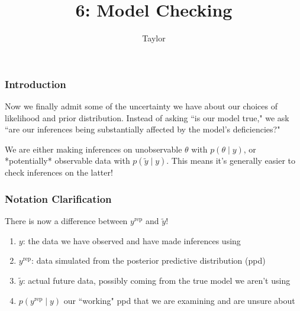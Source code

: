 \documentclass{beamer}
\title["6"]{6: Model Checking}
\author{Taylor}
\institute[UVA] 
{
University of Virginia \\
\medskip
\textit{} 
}
\date{}
\begin{document}

\begin{frame}
\titlepage 
\end{frame}

\begin{frame}
\frametitle{Introduction}

Now we finally admit some of the uncertainty we have about our choices of likelihood and prior distribution. Instead of asking ``is our  model true," we ask ``are our inferences being substantially affected by the model's deficiencies?"
\newline

We are either making inferences on unobservable $\theta$ with $p(\theta \mid y)$, or *potentially* observable data with $p(\tilde{y} \mid y)$. This means it's generally easier to check inferences on the latter!

\end{frame}

\begin{frame}
\frametitle{Notation Clarification}

There is now a difference between $y^{\text{rep}}$ and $\tilde{y}$!
\newline

\begin{enumerate}
\item $y$: the data we have observed and have made inferences using
\item $y^{\text{rep}}$: data simulated from the posterior predictive distribution (ppd)
\item $\tilde{y}$: actual future data, possibly coming from the \*true\* model we aren't using
\item $p(y^{\text{rep}} \mid y)$ our ``working" ppd that we are examining and are unsure about
\end{enumerate}


\end{frame}
\end{document}

